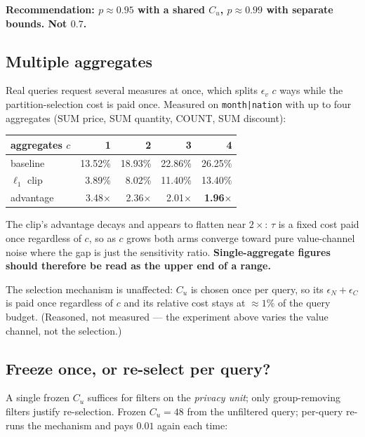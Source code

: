 \documentclass[11pt,a4paper]{article}
\newcommand{\Cu}{C_u}
\begin{document}
\textbf{Recommendation: $p \approx 0.95$ with a shared $\Cu$, $p \approx 0.99$ with separate
bounds. Not $0.7$.}

\subsection{Multiple aggregates}\label{sec:multiagg}

Real queries request several measures at once, which splits $\epsilon_v$ $c$ ways while the
partition-selection cost is paid once. Measured on \texttt{month|nation} with up to four aggregates
(SUM price, SUM quantity, COUNT, SUM discount):

\begin{center}\small
\begin{tabular}{lrrrr}
\toprule
aggregates $c$ & 1 & 2 & 3 & 4 \\
\midrule
baseline & 13.52\% & 18.93\% & 22.86\% & 26.25\% \\
$\ell_1$ clip & 3.89\% & 8.02\% & 11.40\% & 13.40\% \\
\midrule
advantage & 3.48$\times$ & 2.36$\times$ & 2.01$\times$ & \textbf{1.96$\times$} \\
\bottomrule
\end{tabular}
\end{center}

The clip's advantage decays and appears to flatten near $2\times$: $\tau$ is a fixed cost paid once
regardless of $c$, so as $c$ grows both arms converge toward pure value-channel noise where the gap
is just the sensitivity ratio. \textbf{Single-aggregate figures should therefore be read as the
upper end of a range.}

The selection mechanism is unaffected: $\Cu$ is chosen once per query, so its
$\epsilon_N + \epsilon_C$ is paid once regardless of $c$ and its relative cost stays at $\approx 1\%$
of the query budget. (Reasoned, not measured --- the experiment above varies the value channel, not
the selection.)

\subsection{Freeze once, or re-select per query?}\label{sec:freeze}

A single frozen $\Cu$ suffices for filters on the \emph{privacy unit}; only group-removing filters
justify re-selection. Frozen $\Cu = 48$ from the unfiltered query; per-query re-runs the mechanism
and pays $0.01$ again each time:
\end{document}
